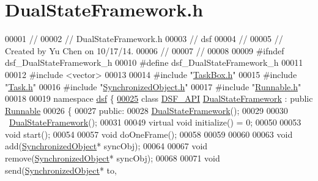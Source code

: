 \hypertarget{_dual_state_framework_8h_source}{}\section{Dual\+State\+Framework.\+h}
\label{_dual_state_framework_8h_source}

\begin{DoxyCode}
00001 \textcolor{comment}{//}
00002 \textcolor{comment}{//  DualStateFramework.h}
00003 \textcolor{comment}{//  dsf}
00004 \textcolor{comment}{//}
00005 \textcolor{comment}{//  Created by Yu Chen on 10/17/14.}
00006 \textcolor{comment}{//}
00007 \textcolor{comment}{//}
00008 
00009 \textcolor{preprocessor}{#ifndef dsf\_DualStateFramework\_h}
00010 \textcolor{preprocessor}{#define dsf\_DualStateFramework\_h}
00011 
00012 \textcolor{preprocessor}{#include <vector>}
00013 
00014 \textcolor{preprocessor}{#include "\hyperlink{_task_box_8h}{TaskBox.h}"}
00015 \textcolor{preprocessor}{#include "\hyperlink{_task_8h}{Task.h}"}
00016 \textcolor{preprocessor}{#include "\hyperlink{_synchronized_object_8h}{SynchronizedObject.h}"}
00017 \textcolor{preprocessor}{#include "\hyperlink{_runnable_8h}{Runnable.h}"}
00018 
00019 \textcolor{keyword}{namespace }\hyperlink{namespacedsf}{dsf} \{
\hypertarget{_dual_state_framework_8h_source_l00025}{}\hyperlink{classdsf_1_1_dual_state_framework}{00025}     \textcolor{keyword}{class }\hyperlink{dsf_2_export_8h_ad7bb940831423512f29a6981786c37bd}{DSF\_API} \hyperlink{classdsf_1_1_dual_state_framework}{DualStateFramework} : \textcolor{keyword}{public} \hyperlink{classdsf_1_1_runnable}{Runnable}
00026     \{
00027     \textcolor{keyword}{public}:
00028         \hyperlink{namespacedsf_a68ac3b6a0526bfa7f6a412918afb1841}{DualStateFramework}();
00029         
00030         ~\hyperlink{classdsf_1_1_dual_state_framework}{DualStateFramework}();
00031         
00049         \textcolor{keyword}{virtual} \textcolor{keywordtype}{void} initialize() = 0;
00050         
00053         \textcolor{keywordtype}{void} start();
00054         
00057         \textcolor{keywordtype}{void} doOneFrame();
00058         
00059         
00060         
00063         \textcolor{keywordtype}{void} add(\hyperlink{classdsf_1_1_synchronized_object}{SynchronizedObject}* syncObj);
00064         
00067         \textcolor{keywordtype}{void} \textcolor{keyword}{remove}(\hyperlink{classdsf_1_1_synchronized_object}{SynchronizedObject}* syncObj);
00068         
00071         \textcolor{keywordtype}{void} send(\hyperlink{classdsf_1_1_synchronized_object}{SynchronizedObject}* to,

\end{DoxyCode}
